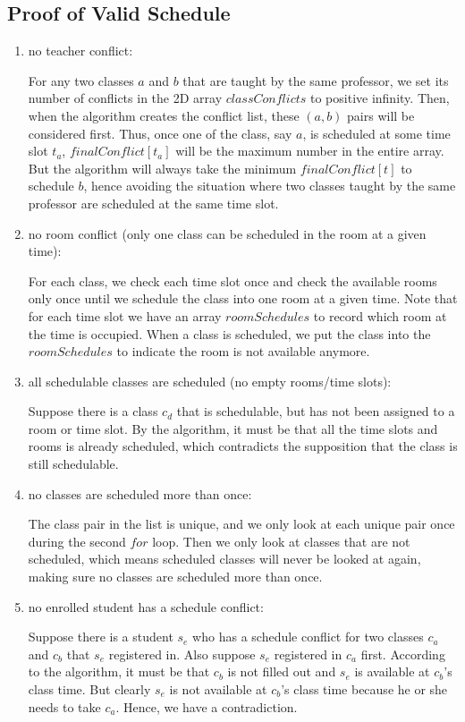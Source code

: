 \documentclass[11pt, oneside]{article}   	%
\begin{document}
\subsection{Proof of Valid Schedule}
\begin{enumerate}
    \item no teacher conflict:
    
    For any two classes $a$ and $b$ that are taught by the same professor, we set its number of conflicts in the 2D array $classConflicts$ to positive infinity. Then, when the algorithm creates the conflict list, these $(a,b)$ pairs will be considered first. Thus, once one of the class, say $a$, is scheduled at some time slot $t_a$, $finalConflict[t_a]$ will be the maximum number in the entire array. But the algorithm will always take the minimum $finalConflict[t]$ to schedule $b$, hence avoiding the situation where two classes taught by the same professor are scheduled at the same time slot. 
    
    \item no room conflict (only one class can be scheduled in the room at a given time):
    
    For each class, we check each time slot once and check the available rooms only once until we schedule the class into one room at a given time. Note that for each time slot we have an array $roomSchedules$ to record which room at the time is occupied. When a class is scheduled, we put the class into the $roomSchedules$ to indicate the room is not available anymore. 
    
    \item all schedulable classes are scheduled (no empty rooms/time slots):
    
    Suppose there is a class $c_d$ that is schedulable, but has not been assigned to a room or time slot. By the algorithm, it must be that all the time slots and rooms is already scheduled, which contradicts the supposition that the class is still schedulable. 
    
    \item no classes are scheduled more than once:
    
    The class pair in the list is unique, and we only look at each unique pair once during the second $for$ loop. Then we only look at classes that are not scheduled, which means scheduled classes will never be looked at again, making sure no classes are scheduled more than once.
    
    \item no enrolled student has a schedule conflict:
    
    Suppose there is a student $s_e$ who has a schedule conflict for two classes $c_a$ and $c_b$ that $s_e$ registered in. Also suppose $s_e$ registered in $c_a$ first. According to the algorithm, it must be that $c_b$ is not filled out and $s_e$ is available at $c_b$'s class time. But clearly $s_e$ is not available at $c_b$'s class time because he or she needs to take $c_a$. Hence, we have a contradiction.
    
    
\end{enumerate}
\end{document}
